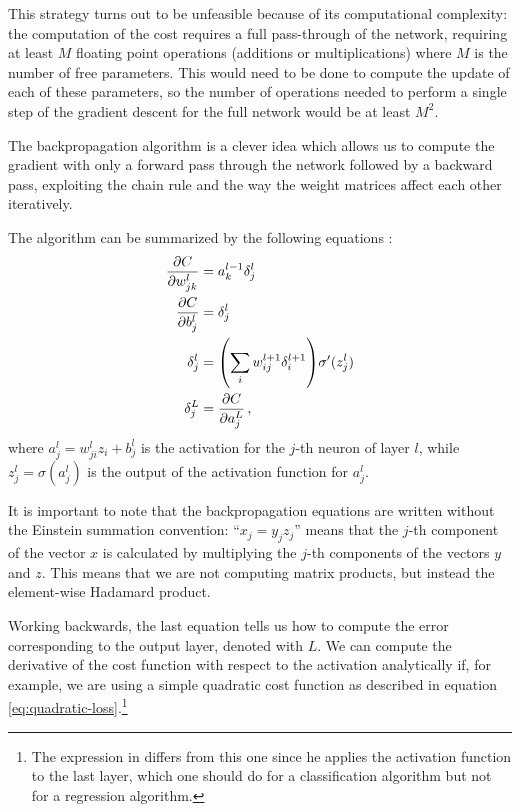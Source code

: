\documentclass[main.tex]{subfiles}
\begin{document}
This strategy turns out to be unfeasible because of its computational complexity: the computation of the cost requires a full pass-through of the network, requiring at least \(M\) floating point operations (additions or multiplications) where \(M\) is the number of free parameters. 
This would need to be done to compute the update of each of these parameters, so the number of operations needed to perform a single step of the gradient descent for the full network would be at least \(M^2\).

The backpropagation algorithm is a clever idea which allows us to compute the gradient with only a forward pass through the network followed by a backward pass, exploiting the chain rule and the way the weight matrices affect each other iteratively. 

The algorithm can be summarized by the following equations \cite[chapter 2]{nielsenNeuralNetworksDeep2015}: 
%
\begin{align}
\pdv{C}{w_{jk}^{l}} &= a_{k}^{l-1} \delta^{l}_{j}  \\
\pdv{C}{b_{j}^{l}} &= \delta^{l}_{j}  \\
\delta^{l}_{j} &= \qty(\sum _{i} w^{l+1}_{ij} \delta^{l+1}_i) \sigma' (z^{l}_j)  \\
\delta^{L}_j &= \pdv{C}{a_j^{L}}
\,,
\end{align}
%
where \(a^{l}_{j} = w^{l}_{ji} z_i + b_j^{l}\) is the activation for the \(j\)-th neuron of layer \(l\), while \(z^{l}_j = \sigma (a^{l}_{j})\) is the output of the activation function for \(a_{j}^{l}\).

It is important to note that the backpropagation equations are written without the Einstein summation convention: ``\(x_j = y_j z_j\)'' means that the \(j\)-th component of the vector \(x\) is calculated by multiplying the \(j\)-th components of the vectors \(y\) and \(z\). 
This means that we are not computing matrix products, but instead the element-wise Hadamard product. 

Working backwards, the last equation tells us how to compute the error corresponding to the output layer, denoted with \(L\). We can compute the derivative of the cost function with respect to the activation analytically if, for example, we are using a simple quadratic cost function as described in equation \ref{eq:quadratic-loss}.\footnote{The expression in \cite[]{nielsenNeuralNetworksDeep2015} differs from this one since he applies the activation function to the last layer, which one should do for a classification algorithm but not for a regression algorithm.}
\end{document}
